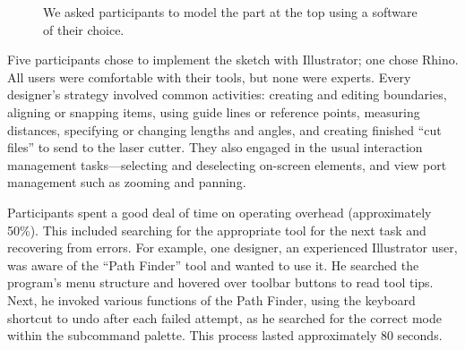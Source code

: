 \documentclass{article}
\begin{document}
\begin{figure}[h]
\centering {}

\caption{We asked participants to model the part at the top using
  a software of their choice.}
\label{fig:interview-sketch}
\end{figure}

Five participants chose to implement the sketch with Illustrator; one
chose Rhino. All users were comfortable with their tools, but none
were experts. Every designer's strategy involved common activities:
creating and editing boundaries, aligning or snapping items, using
guide lines or reference points, measuring distances, specifying or
changing lengths and angles, and creating finished ``cut files'' to
send to the laser cutter.  They also engaged in the usual interaction
management tasks---selecting and deselecting on-screen elements, and
view port management such as zooming and panning.

Participants spent a good deal of time on operating overhead
(approximately 50\%). This included searching for the appropriate tool
for the next task and recovering from errors. For example, one
designer, an experienced Illustrator user, was aware of the ``Path
Finder'' tool and wanted to use it. He searched the program's menu
structure and hovered over toolbar buttons to read tool tips. Next, he
invoked various functions of the Path Finder, using the keyboard
shortcut to undo after each failed attempt, as he searched for the
correct mode within the subcommand palette. This process lasted
approximately 80 seconds.
\end{document}
